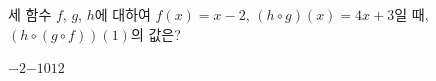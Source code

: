 세 함수 $f$, $g$, $h$에 대하여 $f(x)=x-2$, $(h\circ g)(x)=4x+3$일 때, $(h\circ(g\circ f))(1)$의 값은?
\begin{choices32}{$-2$}{$-1$}{$0$}{$1$}{$2$}\end{choices32}
